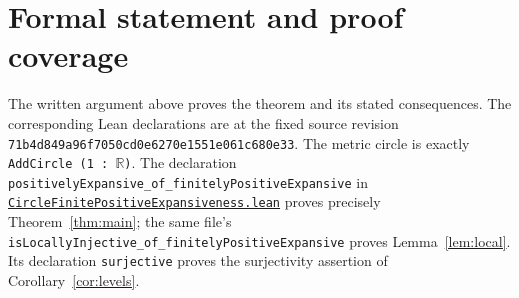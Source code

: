 \documentclass[11pt]{article}
\begin{document}
\section{Formal statement and proof coverage}
\begingroup\small\raggedright
The written argument above proves the theorem and its stated consequences. The corresponding Lean declarations are at the fixed source revision
\texttt{71b4d849a96f7050cd0e6270e1551e061c680e33}. The metric circle is exactly \texttt{AddCircle (1 : $\mathbb R$)}. The declaration
\texttt{positivelyExpansive\_\allowbreak of\_\allowbreak finitelyPositiveExpansive}
in \href{https://github.com/the-omega-institute/trureturing/blob/71b4d849a96f7050cd0e6270e1551e061c680e33/D5/S1/Dynamics/Shadowing/CircleFinitePositiveExpansiveness.lean}{\texttt{CircleFinitePositiveExpansiveness.lean}}
proves precisely Theorem~\ref{thm:main}; the same file's
\texttt{isLocallyInjective\_\allowbreak of\_\allowbreak finitelyPositiveExpansive}
proves Lemma~\ref{lem:local}.
Its declaration \texttt{surjective} proves the surjectivity assertion of
Corollary~\ref{cor:levels}.
\end{document}
